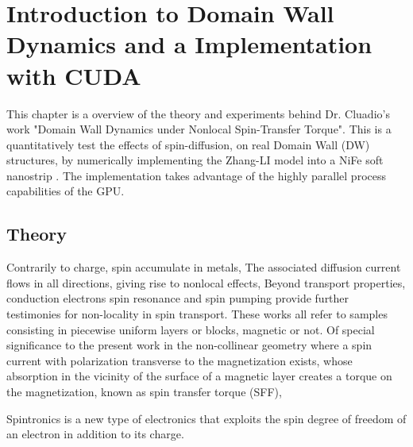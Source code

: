
\chapter{Introduction to Domain Wall Dynamics and a Implementation with CUDA} %

\label{Introduction to DW Dynamics} %


This chapter is a overview of the theory and experiments behind Dr. Cluadio's work "Domain Wall Dynamics under Nonlocal Spin-Transfer Torque". This is a quantitatively test the effects of spin-diffusion, on real Domain Wall (DW) structures, by numerically implementing the Zhang-LI model into a NiFe soft nanostrip \cite{claudio}. The implementation takes advantage of the highly parallel process capabilities of the GPU.


\section{Theory}

Contrarily to charge, spin accumulate in metals, The associated diffusion current flows in all directions, giving rise to nonlocal effects, Beyond transport properties, conduction electrons spin resonance and spin pumping provide further testimonies for non-locality in spin transport. These works all refer  to samples consisting in piecewise uniform layers or blocks, magnetic or not. Of special significance to the present work in the non-collinear geometry where a spin current with polarization transverse to the magnetization exists, whose absorption in the vicinity of the surface of a magnetic layer creates a torque on the magnetization, known as spin transfer torque (SFF),  \cite{claudio}

Spintronics is a new type of electronics that exploits the spin degree of freedom of an electron in addition to its charge. \cite{spinz}

\cite{ferro}

